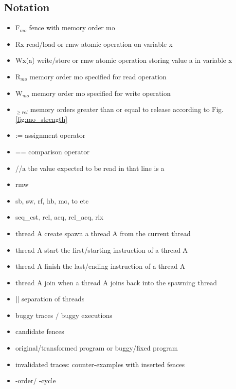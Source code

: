\subsection{Notation}
\begin{itemize}
	\item F$_{mo}$ \qquad fence with memory order mo
	\item Rx \qquad read/load or rmw atomic operation on variable x
	\item Wx(a) \qquad write/store or rmw atomic operation storing value a in variable x
	\item R$_{mo}$ \qquad memory order mo specified for read operation
	\item W$_{mo}$ \qquad memory order mo specified for write operation
	\item $_{\geq rel}$ \qquad memory orders greater than or equal to release according to Fig. \ref{fig:mo_strength}
	\item := \qquad assignment operator
	\item == \qquad comparison operator
	\item \color{olive}//a \color{black} \qquad the value expected to be read in that line is a
	\item rmw
	\item sb, sw, rf, hb, mo, to \qquad {} etc 
	\item seq\_cst, rel, acq, rel\_acq, rlx
	\item thread A create \qquad spawn a thread A from the current thread
	\item thread A start \qquad the first/starting instruction of a thread A
	\item thread A finish \qquad the last/ending instruction of a thread A
	\item thread A join \qquad when a thread A joins back into the spawning thread
	\item || separation of threads
	\item buggy traces / buggy executions
	\item candidate fences
	\item original/transformed program or buggy/fixed program
	\item invalidated traces: counter-examples with inserted fences
	\item \setSC-order/ \setSC-cycle
\end{itemize}